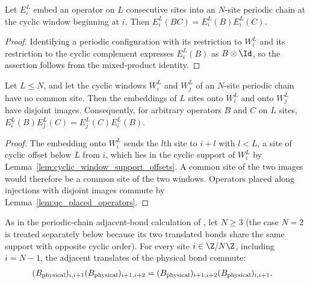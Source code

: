 \begin{lemma}
    \label{thm:mpdo_cyclic_local_embedding_mul}
    \leanok
    Let $E_i^L$ embed an operator on $L$ consecutive sites into an
    $N$-site periodic chain at the cyclic window beginning at $i$. Then
    $E_i^L(BC)=E_i^L(B)E_i^L(C)$.
\end{lemma}

\begin{proof}\leanok
    Identifying a periodic configuration with its restriction to $W_i^L$ and
    its restriction to the cyclic complement expresses $E_i^L(B)$ as
    $B\otimes\Id$, so the assertion follows from the mixed-product identity.
\end{proof}

\begin{lemma}
    \label{thm:mpdo_disjoint_cyclic_local_embeddings_comm}
    \leanok
    Let $L\leq N$, and let the cyclic windows $W_i^L$ and $W_j^L$ of an
    $N$-site periodic chain have no common site. Then the embeddings of $L$
    sites onto $W_i^L$ and onto $W_j^L$ have disjoint images. Consequently,
    for arbitrary operators $B$ and $C$ on $L$ sites,
    $E_i^L(B)E_j^L(C)=E_j^L(C)E_i^L(B)$.
\end{lemma}

\begin{proof}\leanok
    The embedding onto $W_i^L$ sends the $l$th site to $i+l$ with $l<L$, a
    site of cyclic offset below $L$ from $i$, which lies in the cyclic support
    of $W_i^L$ by Lemma~\ref{lem:cyclic_window_support_offsets}. A common site
    of the two images would therefore be a common site of the two windows.
    Operators placed along injections with disjoint images commute by
    Lemma~\ref{lem:qc_placed_operators}.
\end{proof}

\begin{lemma}
    \label{thm:mpdo_periodic_adjacent_physical_bonds_comm}
    \leanok
    As in the periodic-chain adjacent-bond calculation of
    \cite[Appendix~C.2, Proposition~C.8, lines~1571--1593]
    {Cirac2016MPDO_arXiv}, let $N\geq 3$ (the case $N=2$ is treated separately
    below because its two translated bonds share the same support with opposite
    cyclic order). For every site $i\in\Z/N\Z$, including $i=N-1$, the adjacent
    translates of the physical bond commute:
    \begin{align}
        (B_{\mathrm{physical}})_{i,i+1}
        (B_{\mathrm{physical}})_{i+1,i+2}
         & =
        (B_{\mathrm{physical}})_{i+1,i+2}
        (B_{\mathrm{physical}})_{i,i+1}.
        \notag
    \end{align}
\end{lemma}

